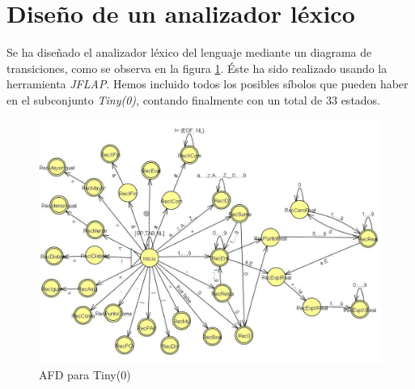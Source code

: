 \section{Diseño de un analizador léxico}

Se ha diseñado el analizador léxico del lenguaje mediante un diagrama de transiciones, como se observa en la figura \ref{fig:diagrama_afd}.
Éste ha sido realizado usando la herramienta \textit{JFLAP}. Hemos incluido todos los posibles síbolos que pueden haber en
el subconjunto \textit{Tiny(0)}, contando finalmente con un total de 33 estados.

\begin{figure}[H]
    \centering
    \includegraphics[width=0.8\linewidth]{Secciones/Hito1/Tiny0/diagrama_afd.jpg}
    \caption{AFD para Tiny(0)}
    \label{fig:diagrama_afd}
\end{figure}